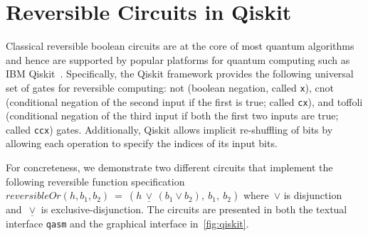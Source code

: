 \section{Reversible Circuits in Qiskit}
\label{sec:qiskit}
\label{sec:examples}

Classical reversible boolean circuits are at the core of most quantum algorithms and hence are supported by popular
platforms for quantum computing such as IBM Qiskit~\cite{aleksandrowiczQiskitOpensourceFramework2019}. Specifically, the
Qiskit framework provides the following universal set of gates for reversible computing: \textsf{not} (boolean negation,
called \verb|x|), \textsf{cnot} (conditional negation of the second input if the first is true; called \verb|cx|), and
\textsf{toffoli} (conditional negation of the third input if both the first two inputs are true; called \verb|ccx|)
gates. Additionally, Qiskit allows implicit re-shuffling of bits by allowing each operation to specify the indices of
its input bits.

For concreteness, we demonstrate two different circuits that implement the following reversible function specification
$\mathit{reversibleOr}(h,b_1,b_2) ~=~ (h \,\underline{\vee}\, (b_1 \vee b_2), ~b_1, ~b_2)$ where~$\vee$ is disjunction
and~$\underline{\vee}$ is exclusive-disjunction. The circuits are presented in both the textual interface \verb|qasm|
and the graphical interface in~\cref{fig:qiskit}.

